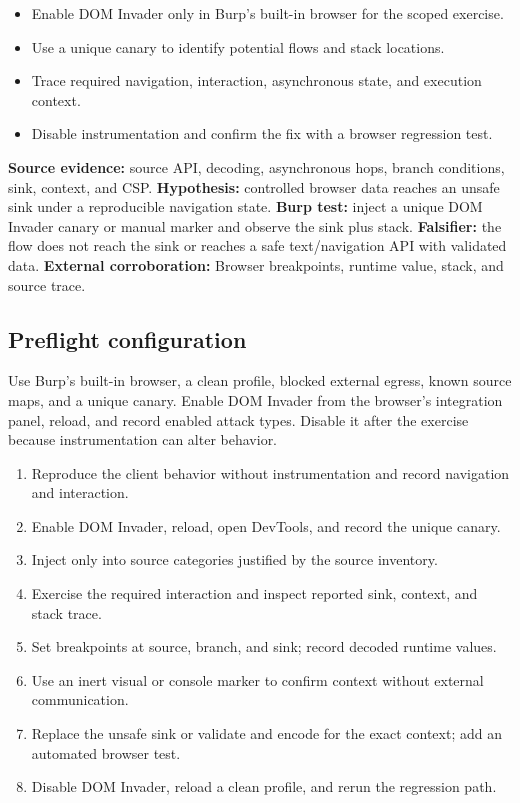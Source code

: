 \documentclass[11pt]{article}
\newcommand{\weekfield}[2]{%
  \Needspace{5\baselineskip}
  \subsection*{#1}
  #2
}
\newcommand{\externalproof}[1]{\textbf{External corroboration:} #1}
\begin{document}
\begin{objectivebox}
\begin{itemize}
  \item Enable DOM Invader only in Burp's built-in browser for the scoped exercise.
  \item Use a unique canary to identify potential flows and stack locations.
  \item Trace required navigation, interaction, asynchronous state, and execution context.
  \item Disable instrumentation and confirm the fix with a browser regression test.
\end{itemize}
\end{objectivebox}

\begin{bridgebox}
\textbf{Source evidence:} source API, decoding, asynchronous hops, branch
conditions, sink, context, and CSP. \textbf{Hypothesis:} controlled browser data
reaches an unsafe sink under a reproducible navigation state. \textbf{Burp test:}
inject a unique DOM Invader canary or manual marker and observe the sink plus
stack. \textbf{Falsifier:} the flow does not reach the sink or reaches a safe
text/navigation API with validated data. \externalproof{Browser breakpoints,
runtime value, stack, and source trace.}
\end{bridgebox}

\weekfield{Preflight configuration}{Use Burp's built-in browser, a clean profile,
blocked external egress, known source maps, and a unique canary. Enable DOM
Invader from the browser's integration panel, reload, and record enabled attack
types. Disable it after the exercise because instrumentation can alter behavior.}

\begin{procedurebox}
\begin{enumerate}
  \item Reproduce the client behavior without instrumentation and record navigation and interaction.
  \item Enable DOM Invader, reload, open DevTools, and record the unique canary.
  \item Inject only into source categories justified by the source inventory.
  \item Exercise the required interaction and inspect reported sink, context, and stack trace.
  \item Set breakpoints at source, branch, and sink; record decoded runtime values.
  \item Use an inert visual or console marker to confirm context without external communication.
  \item Replace the unsafe sink or validate and encode for the exact context; add an automated browser test.
  \item Disable DOM Invader, reload a clean profile, and rerun the regression path.
\end{enumerate}
\end{procedurebox}
\end{document}
